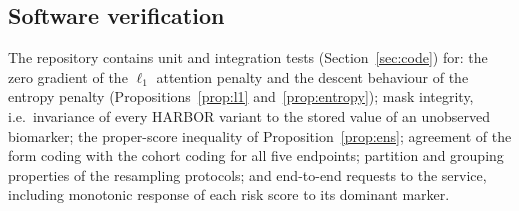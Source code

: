 \subsection{Software verification}
The repository contains unit and integration tests (Section~\ref{sec:code}) for: the zero gradient of the $\ell_1$ attention penalty and the descent behaviour of the entropy penalty (Propositions~\ref{prop:l1} and~\ref{prop:entropy}); mask integrity, i.e.\ invariance of every HARBOR variant to the stored value of an unobserved biomarker; the proper-score inequality of Proposition~\ref{prop:ens}; agreement of the form coding with the cohort coding for all five endpoints; partition and grouping properties of the resampling protocols; and end-to-end requests to the service, including monotonic response of each risk score to its dominant marker.
